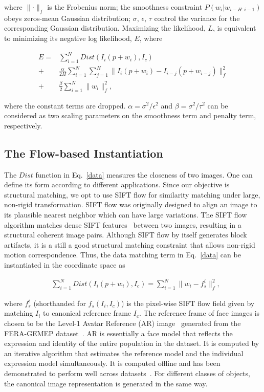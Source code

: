 \documentclass[10pt,journal]{IEEEtran}
\begin{document}
\noindent where $\parallel \cdot \parallel_f$ is the Frobenius norm; the smoothness constraint $P(w_i|w_{i-H:i-1})$ obeys zeros-mean Gaussian distribution; $\sigma$, $\epsilon$, $\tau$ control the variance for the corresponding Gaussian distribution. Maximizing the likelihood, $L$, is equivalent to minimizing its negative log likelihood, $E$, where

\begin{align}
\label{data}
E = &\sum_{i=1}^{N}Dist(I_i(p+w_i),I_c) \\
\label{smooth}
	+ &\frac{\alpha}{2H}\sum_{i=1}^{N}\sum_{j=1}^{H}\parallel{I_i(p+w_i)-I_{i-j}(p+w_{i-j})}\parallel_f^2 \\
\label{penalty}
	+ &\frac{\beta}{2}\sum_{i=1}^{N}\parallel{w_i}\parallel_f^2,
\end{align}


\noindent where the constant terms are dropped. $\alpha=\sigma^2 / \epsilon^2$ and $\beta=\sigma^2 / \tau^2$ can be considered as two scaling parameters on the smoothness term and penalty term, respectively. 

\subsection{\label{sec:model}The Flow-based Instantiation}

The $Dist$ function in Eq.~\eqref{data} measures the closeness of two images. One can define its form according to different applications. Since our objective is structural matching, we opt to use SIFT flow \cite{Liu_PAMI11} for similarity matching under large, non-rigid transformation. SIFT flow \cite{Liu_PAMI11} was originally designed to align an image to its plausible nearest neighbor which can have large variations. The SIFT flow algorithm matches dense SIFT features~\cite{SIFT} between two images, resulting in a structural coherent image pairs. Although SIFT flow by itself generates block artifacts, it is a still a good structural matching constraint that allows non-rigid motion correspondence. Thus, the data matching term in Eq.~\eqref{data} can be instantiated in the coordinate space as

\begin{align}
\label{data_sift}
&\sum_{i=1}^{N}Dist(I_i(p+w_i),I_c)=\sum_{i=1}^{N}\parallel{w_i-f_s^i}\parallel_f^2,
\end{align}

\noindent where $f_s^i$ (shorthanded for $f_s(I_i,I_c)$) is the pixel-wise SIFT flow field given by matching $I_i$ to canonical reference frame $I_c$. The reference frame of face images is chosen to be the Level-1 Avatar Reference (AR) image~\cite{Yang_SMCB12} generated from the FERA-GEMEP dataset~\cite{Valstar_FERA11}. AR is essentially a face model that reflects the expression and identity of the entire population in the dataset. It is computed by an iterative algorithm that estimates the reference model and the individual expression model simultaneously. It is computed offline and has been demonstrated to perform well across datasets~\cite{Yang_SMCB12}. For different classes of objects, the canonical image representation is generated in the same way.
\end{document}

